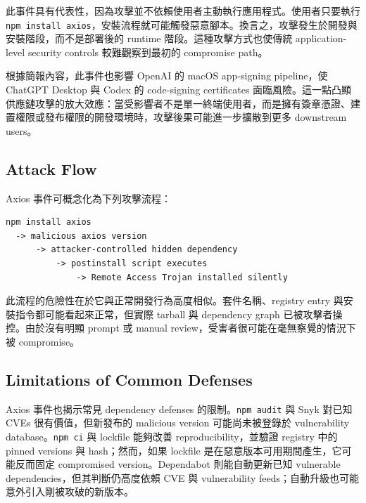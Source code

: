 \documentclass[12pt,a4paper]{article}
\begin{document}
此事件具有代表性，因為攻擊並不依賴使用者主動執行應用程式。使用者只要執行 \texttt{npm install axios}，安裝流程就可能觸發惡意腳本。換言之，攻擊發生於開發與安裝階段，而不是部署後的 runtime 階段。這種攻擊方式也使傳統 application-level security controls 較難觀察到最初的 compromise path。

根據簡報內容，此事件也影響 OpenAI 的 macOS app-signing pipeline，使 ChatGPT Desktop 與 Codex 的 code-signing certificates 面臨風險。這一點凸顯供應鏈攻擊的放大效應：當受影響者不是單一終端使用者，而是擁有簽章憑證、建置權限或發布權限的開發環境時，攻擊後果可能進一步擴散到更多 downstream users。

\subsection{Attack Flow}

Axios 事件可概念化為下列攻擊流程：

\begin{lstlisting}[style=commandstyle]
npm install axios
  -> malicious axios version
      -> attacker-controlled hidden dependency
          -> postinstall script executes
              -> Remote Access Trojan installed silently
\end{lstlisting}

此流程的危險性在於它與正常開發行為高度相似。套件名稱、registry entry 與安裝指令都可能看起來正常，但實際 tarball 與 dependency graph 已被攻擊者操控。由於沒有明顯 prompt 或 manual review，受害者很可能在毫無察覺的情況下被 compromise。

\subsection{Limitations of Common Defenses}

Axios 事件也揭示常見 dependency defenses 的限制。\texttt{npm audit} 與 Snyk 對已知 CVEs 很有價值，但新發布的 malicious version 可能尚未被登錄於 vulnerability database。\texttt{npm ci} 與 lockfile 能夠改善 reproducibility，並驗證 registry 中的 pinned versions 與 hash；然而，如果 lockfile 是在惡意版本可用期間產生，它可能反而固定 compromised version。Dependabot 則能自動更新已知 vulnerable dependencies，但其判斷仍高度依賴 CVE 與 vulnerability feeds；自動升級也可能意外引入剛被攻破的新版本。
\end{document}
